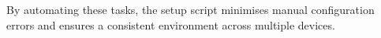 By automating these tasks, the setup script minimises manual configuration errors and ensures a consistent environment across multiple devices.











